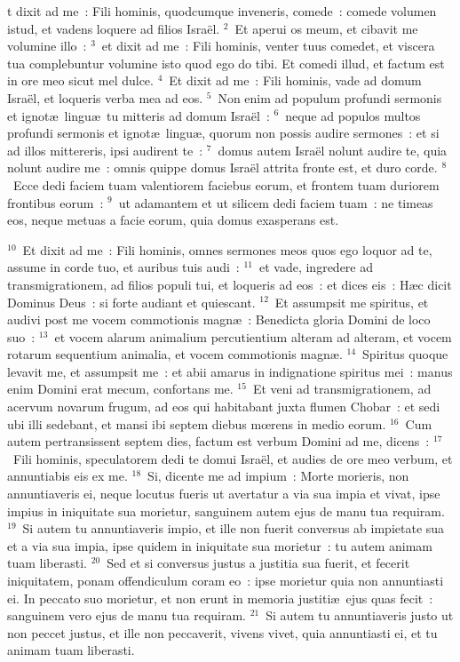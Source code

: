 \bchapter
{}t dixit ad me~: Fili hominis, quodcumque inveneris, comede~: comede volumen istud, et vadens loquere ad filios Isra\"el.
${}^{2}$~Et aperui os meum, et cibavit me volumine illo~:
${}^{3}$~et dixit ad me~: Fili hominis, venter tuus comedet, et viscera tua complebuntur volumine isto quod ego do tibi. Et comedi illud, et factum est in ore meo sicut mel dulce.
${}^{4}$~Et dixit ad me~: Fili hominis, vade ad domum Isra\"el, et loqueris verba mea ad eos.
${}^{5}$~Non enim ad populum profundi sermonis et ignot\ae\ lingu\ae\ tu mitteris ad domum Isra\"el~:
${}^{6}$~neque ad populos multos profundi sermonis et ignot\ae\ lingu\ae , quorum non possis audire sermones~: et si ad illos mittereris, ipsi audirent te~:
${}^{7}$~domus autem Isra\"el nolunt audire te, quia nolunt audire me~: omnis quippe domus Isra\"el attrita fronte est, et duro corde.
${}^{8}$~Ecce dedi faciem tuam valentiorem faciebus eorum, et frontem tuam duriorem frontibus eorum~:
${}^{9}$~ut adamantem et ut silicem dedi faciem tuam~: ne timeas eos, neque metuas a facie eorum, quia domus exasperans est.


${}^{10}$~Et dixit ad me~: Fili hominis, omnes sermones meos quos ego loquor ad te, assume in corde tuo, et auribus tuis audi~:
${}^{11}$~et vade, ingredere ad transmigrationem, ad filios populi tui, et loqueris ad eos~: et dices eis~: H\ae c dicit Dominus Deus~: si forte audiant et quiescant.
${}^{12}$~Et assumpsit me spiritus, et audivi post me vocem commotionis magn\ae~: Benedicta gloria Domini de loco suo~:
${}^{13}$~et vocem alarum animalium percutientium alteram ad alteram, et vocem rotarum sequentium animalia, et vocem commotionis magn\ae .
${}^{14}$~Spiritus quoque levavit me, et assumpsit me~: et abii amarus in indignatione spiritus mei~: manus enim Domini erat mecum, confortans me.
${}^{15}$~Et veni ad transmigrationem, ad acervum novarum frugum, ad eos qui habitabant juxta flumen Chobar~: et sedi ubi illi sedebant, et mansi ibi septem diebus mœrens in medio eorum.
${}^{16}$~Cum autem pertransissent septem dies, factum est verbum Domini ad me, dicens~:
${}^{17}$~Fili hominis, speculatorem dedi te domui Isra\"el, et audies de ore meo verbum, et annuntiabis eis ex me.
${}^{18}$~Si, dicente me ad impium~: Morte morieris, non annuntiaveris ei, neque locutus fueris ut avertatur a via sua impia et vivat, ipse impius in iniquitate sua morietur, sanguinem autem ejus de manu tua requiram.
${}^{19}$~Si autem tu annuntiaveris impio, et ille non fuerit conversus ab impietate sua et a via sua impia, ipse quidem in iniquitate sua morietur~: tu autem animam tuam liberasti.
${}^{20}$~Sed et si conversus justus a justitia sua fuerit, et fecerit iniquitatem, ponam offendiculum coram eo~: ipse morietur quia non annuntiasti ei. In peccato suo morietur, et non erunt in memoria justiti\ae\ ejus quas fecit~: sanguinem vero ejus de manu tua requiram.
${}^{21}$~Si autem tu annuntiaveris justo ut non peccet justus, et ille non peccaverit, vivens vivet, quia annuntiasti ei, et tu animam tuam liberasti.


